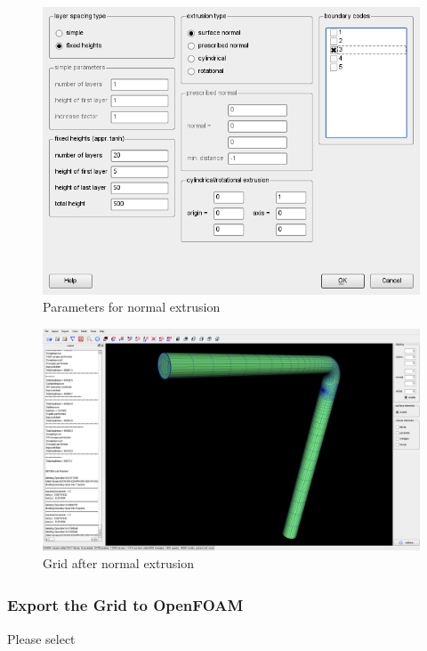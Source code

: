 \documentclass[10pt,a4paper,british]{book}
\newcommand\foam{OpenFOAM\textsuperscript{\textregistered}\ }
\begin{document}
\begin{figure}
  \begin{centering}
    \includegraphics[width=132mm]{figures/tutorials/T1/scr08}
    \par
  \end{centering}
  \caption{Parameters for normal extrusion}
  \label{fig:T1_scr08}
\end{figure}
\begin{figure}
  \begin{centering}
    \includegraphics[width=14cm]{figures/tutorials/T1/scr09}
    \par
  \end{centering}
  \caption{Grid after normal extrusion}
  \label{fig:T1_scr09}
\end{figure}
\clearpage

\subsubsection{Export the Grid to \foam}
Please select
\end{document}
